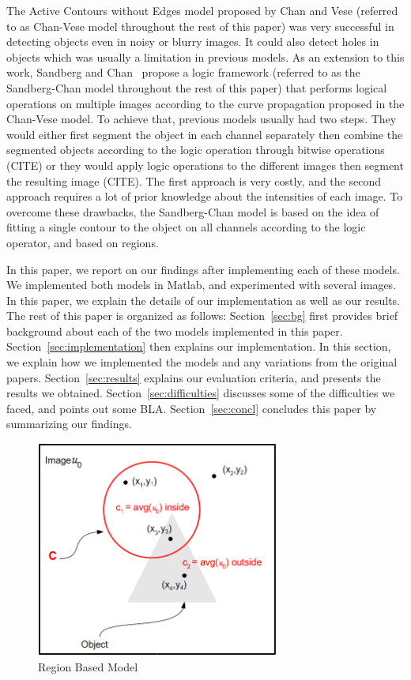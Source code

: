 \documentclass[10pt,journal,letterpaper,compsoc]{IEEEtran}
\begin{document}
The Active Contours without Edges model proposed by Chan and Vese (referred to as Chan-Vese model throughout the rest of this paper) was very successful in
detecting objects even in noisy or blurry images. It could also detect holes in objects which was usually a limitation in previous models. As an extension to
this work, Sandberg and Chan~\cite{sandberg2005logic} propose a logic framework (referred to as the Sandberg-Chan model throughout the rest of this
paper) that  performs logical operations on multiple images according to the curve propagation proposed in the Chan-Vese model. To achieve that, previous models
usually had two steps. They would either first segment the object in each channel separately then combine the segmented objects according to the logic operation
through bitwise operations (CITE) or they would apply logic operations to the different images then segment the resulting image (CITE). The first approach is
very costly, and the second approach requires a lot of prior knowledge about the intensities of each image. To overcome these drawbacks, the Sandberg-Chan
model is based on the idea of fitting a single contour to the object on all channels according to the logic operator, and based on regions.

In this paper, we report on our findings after implementing each of these models. We implemented both models in Matlab, and experimented with several images.
In this paper, we explain the details of our implementation as well as our results. The rest of this paper is organized as follows: Section~\ref{sec:bg} first
provides brief background about each of the two models implemented in this paper. Section~\ref{sec:implementation} then explains our implementation. In this
section, we explain how we implemented the models and any variations from the original papers. Section~\ref{sec:results} explains our evaluation criteria, and
presents the results we obtained. Section~\ref{sec:difficulties} discusses some of the difficulties we faced, and points out some BLA. Section~\ref{sec:concl}
concludes this paper by summarizing our findings.

\begin{figure}[t]
\centering
\includegraphics[width=8cm]{explaining.png}
\caption{Region Based Model}
\label{fig:region}
\end{figure}
\end{document}
